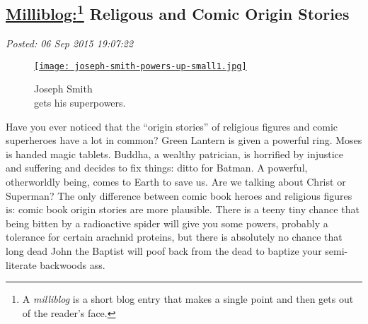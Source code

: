 %

\subsection*{\href{https://bakerjd99.wordpress.com/2015/09/06/milliblog-religous-and-comic-origin-stories/}{Milliblog:\footnote{A \emph{milliblog} is a short blog entry that makes a single point and
  then gets out of the reader's face.} Religous and Comic Origin Stories}}


\noindent\emph{Posted: 06 Sep 2015 19:07:22}
\vspace{6pt}



\captionsetup[figure]{labelformat=empty}
\begin{figure}
\centering
\href{https://bakerjd99.wordpress.com/2015/09/06/milliblog-religous-and-comic-origin-stories/joseph-smith-powers-up-small-2/}{\texttt{[image: joseph-smith-powers-up-small1.jpg]}}
\caption{Joseph Smith\\gets his superpowers.}
\label{fig:5154X0}
\end{figure}

Have you ever noticed that the ``origin stories'' of religious figures
and comic superheroes have a lot in common? Green Lantern is given a
powerful ring. Moses is handed magic tablets. Buddha, a wealthy
patrician, is horrified by injustice and suffering and decides to fix
things: ditto for Batman. A powerful, otherworldly being, comes to Earth
to save us. Are we talking about Christ or Superman? The only difference
between comic book heroes and religious figures is: comic book origin
stories are more plausible. There is a teeny tiny chance that being
bitten by a radioactive spider will give you some powers, probably a
tolerance for certain arachnid proteins, but there is absolutely no
chance that long dead John the Baptist will poof back from the dead to
baptize your semi-literate backwoods ass.


